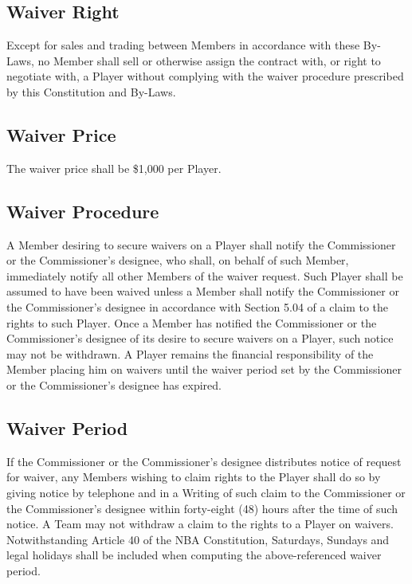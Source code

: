\documentclass[]{book}
\begin{document}
\hypertarget{waiver-right}{%
\subsection{Waiver Right}\label{waiver-right}}

Except for sales and trading between Members in accordance with these By-Laws, no Member shall sell or otherwise assign the contract with, or right to negotiate with, a Player without complying with the waiver procedure prescribed by this Constitution and By-Laws.

\hypertarget{waiver-price}{%
\subsection{Waiver Price}\label{waiver-price}}

The waiver price shall be \$1,000 per Player.

\hypertarget{waiver-procedure}{%
\subsection{Waiver Procedure}\label{waiver-procedure}}

A Member desiring to secure waivers on a Player shall notify the Commissioner or the Commissioner's designee, who shall, on behalf of such Member, immediately notify all other Members of the waiver request. Such Player shall be assumed to have been waived unless a Member shall notify the Commissioner or the Commissioner's designee in accordance with Section 5.04 of a claim to the rights to such Player. Once a Member has notified the Commissioner or the Commissioner's designee of its desire to secure waivers on a Player, such notice may not be withdrawn. A Player remains the financial responsibility of the Member placing him on waivers until the waiver period set by the Commissioner or the Commissioner's designee has expired.

\hypertarget{waiver-period}{%
\subsection{Waiver Period}\label{waiver-period}}

If the Commissioner or the Commissioner's designee distributes notice of request for waiver, any Members wishing to claim rights to the Player shall do so by giving notice by telephone and in a Writing of such claim to the Commissioner or the Commissioner's designee within forty-eight (48) hours after the time of such notice. A Team may not withdraw a claim to the rights to a Player on waivers. Notwithstanding Article 40 of the NBA Constitution, Saturdays, Sundays and legal holidays shall be included when computing the above-referenced waiver period.
\end{document}
